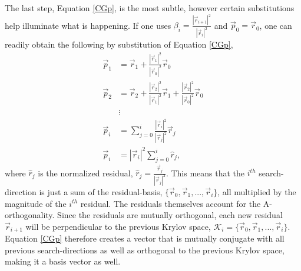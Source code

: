 \documentclass[11pt,letterpaper,oneside,notitlepage]{article}	%
\newcommand{\eq}[1]{Equation \eqref{#1}}		%
\numberwithin{equation}{section}				%
\begin{document}
The last step, \eq{CGp}, is the most subtle, however certain substitutions help illuminate what is happening. If one uses $\beta_i=\frac{|\vec r_{i+1}|^2}{|\vec r_i|^2}$ and $\vec p_0=\vec r_0$, one can readily obtain the following by substitution of \eq{CGp}, 
\begin{align*}
\vec p_1&=\vec r_1+\frac{|\vec r_1|^2}{|\vec r_0|^2}\vec r_0 \\
\vec p_2&=\vec r_2+\frac{|\vec r_2|^2}{|\vec r_1|^2}\vec r_1+ \frac{|\vec r_2|^2}{|\vec r_0|^2}\vec r_0 \\
&\vdots \\
\vec p_i&=\sum_{j=0}^i\frac{|\vec r_i|^2}{|\vec r_j|^2}\vec r_j \\
\vec p_i&=|\vec r_i|^2 \sum_{j=0}^i \hat r_j 
,\end{align*}
where $\hat r_j$ is the normalized residual, $\hat r_j = \frac{\vec r_j}{|\vec r_j|^2}$. This means that the $i^{th}$ search-direction is just a sum of the residual-basis, $\{\vec r_0,\vec r_1,...,\vec r_i \}$, all multiplied by the magnitude of the $i^{th}$ residual. The residuals themselves account for the A-orthogonality. Since the residuals are mutually orthogonal, each new residual $\vec r_{i+1}$ will be perpendicular to the previous Krylov space, $\mathcal{K}_i=\{\vec r_0,\vec r_1,...,\vec r_i \}$. \eq{CGp} therefore creates a vector that is mutually conjugate with all previous search-directions as well as orthogonal to the previous Krylov space, making it a basis vector as well.


\newpage
{}


\end{document}

